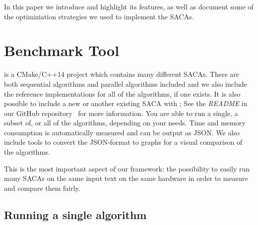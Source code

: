 In this paper we introduce \sacabench and highlight its features,
as well as document some of the optimiziation strategies we used to implement the SACAs.

\section{Benchmark Tool}

\sacabench is a CMake/C++14 project which contains many different SACAs.
There are both sequential algorithms and parallel algorithms included
and we also include the reference implementations for all of the algorithms, if one exists.
It is also possible to include a new or another existing SACA with \sacabench;
See the \emph{README} in our GitHub repository~\cite{sacabench:github} for more information.
You are able to run a single, a subset of, or all of the algorithms, depending on your needs.
Time and memory consumption is automatically measured and can be output as JSON.
We also include tools to convert the JSON-format to graphs for a visual comparison of the algorithms.

This is the most important aspect of our framework:
the possibility to easily run many SACAs on the same input text on the same hardware
in order to measure and compare them fairly.

\subsection{Running a single algorithm}


